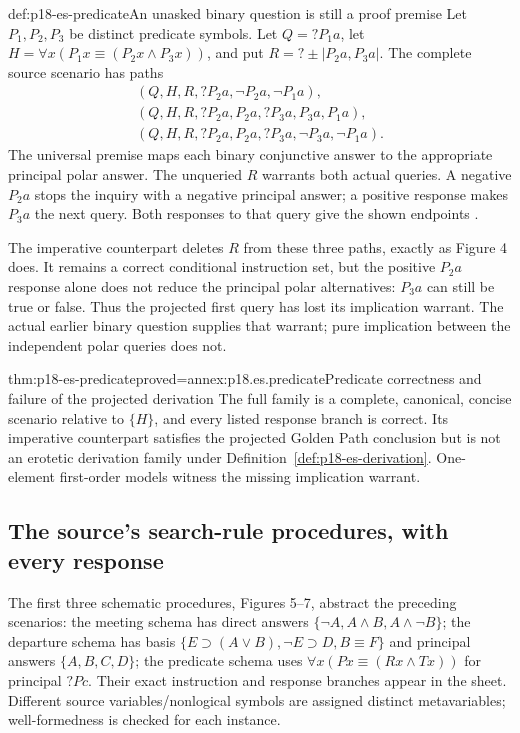 \begin{hbexample}{def:p18-es-predicate}{An unasked binary question is still a proof premise}
Let \(P_1,P_2,P_3\) be distinct predicate symbols. Let \(Q=?P_1a\),
let \(H=\forall x(P_1x\equiv(P_2x\land P_3x))\),
and put \(R=?\pm|P_2a,P_3a|\). The complete source scenario has paths
\[
\begin{array}{l}
 (Q,H,R,?P_2a,\neg P_2a,\neg P_1a),\\
 (Q,H,R,?P_2a,P_2a,?P_3a,P_3a,P_1a),\\
 (Q,H,R,?P_2a,P_2a,?P_3a,\neg P_3a,\neg P_1a).
\end{array}
\]
The universal premise maps each binary conjunctive answer to the appropriate
principal polar answer. The unqueried \(R\) warrants both actual queries.
A negative \(P_2a\) stops the inquiry with a negative principal answer;
a positive response makes \(P_3a\) the next query. Both responses to that
query give the shown endpoints \cite[pp.~33--34]{Wisniewski2001QuestionsInferences}.

The imperative counterpart deletes \(R\) from these three paths, exactly
as Figure 4 does. It remains a correct conditional instruction set, but the
positive \(P_2a\) response alone does not reduce the principal polar alternatives:
\(P_3a\) can still be true or false. Thus the projected first query has lost
its implication warrant. The actual earlier binary question supplies that
warrant; pure implication between the independent polar queries does not.
\end{hbexample}

\begin{hbtheorem}{thm:p18-es-predicate}{proved=annex:p18.es.predicate}{Predicate correctness and failure of the projected derivation}
The full family is a complete, canonical, concise scenario relative to
\(\{H\}\), and every listed response branch is correct. Its imperative
counterpart satisfies the projected Golden Path conclusion but is not an
erotetic derivation family under Definition~\ref{def:p18-es-derivation}.
One-element first-order models witness the missing implication warrant.
\end{hbtheorem}

\subsection{The source's search-rule procedures, with every response}

The first three schematic procedures, Figures 5--7, abstract the preceding
scenarios: the meeting schema has direct answers
\(\{\neg A,A\land B,A\land\neg B\}\); the departure schema has basis
\(\{E\supset(A\lor B),\neg E\supset D,B\equiv F\}\) and principal
answers \(\{A,B,C,D\}\); the predicate schema uses
\(\forall x(Px\equiv(Rx\land Tx))\) for principal \(?Pc\).
Their exact instruction and response branches appear in the sheet. Different
source variables/nonlogical symbols are assigned distinct metavariables;
well-formedness is checked for each instance.

